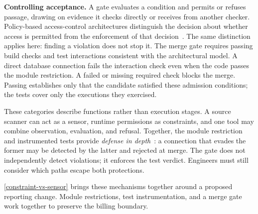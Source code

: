 
\textbf{Controlling acceptance.} A gate evaluates a condition and permits or refuses passage, drawing on evidence it checks directly or receives from another checker. Policy-based access-control architectures distinguish the decision about whether access is permitted from the enforcement of that decision~\citep{rfc2753,oasis2017xacml}. The same distinction applies here: finding a violation does not stop it. The merge gate requires passing build checks and test interactions consistent with the architectural model. A direct database connection fails the interaction check even when the code passes the module restriction. A failed or missing required check blocks the merge. Passing establishes only that the candidate satisfied these admission conditions; the tests cover only the executions they exercised.




These categories describe functions rather than execution stages. A source scanner can act as a sensor, runtime permissions as constraints, and one tool may combine observation, evaluation, and refusal. Together, the module restriction and instrumented tests provide \emph{defense in depth}~\citep{ross2022trustworthysystems}: a connection that evades the former may be detected by the latter and rejected at merge. The gate does not independently detect violations; it enforces the test verdict. Engineers must still consider which paths escape both protections.

\autoref{constraint-vs-sensor} brings these mechanisms together around a proposed reporting change. Module restrictions, test instrumentation, and a merge gate work together to preserve the billing boundary.

